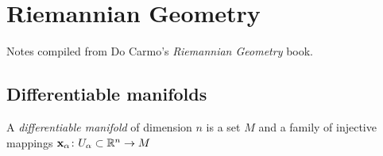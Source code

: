 \chapter{Riemannian Geometry}
Notes compiled from Do Carmo's \emph{Riemannian Geometry} book.
\section{Differentiable manifolds}
\begin{definition}
  A \emph{differentiable manifold} of dimension \(n\) is a set \(M\) and  a
  family of injective mappings \(\mathbf{x}_\alpha\colon U_\alpha\subset\mathbb{R}^n\to
  M\)
\end{definition}

